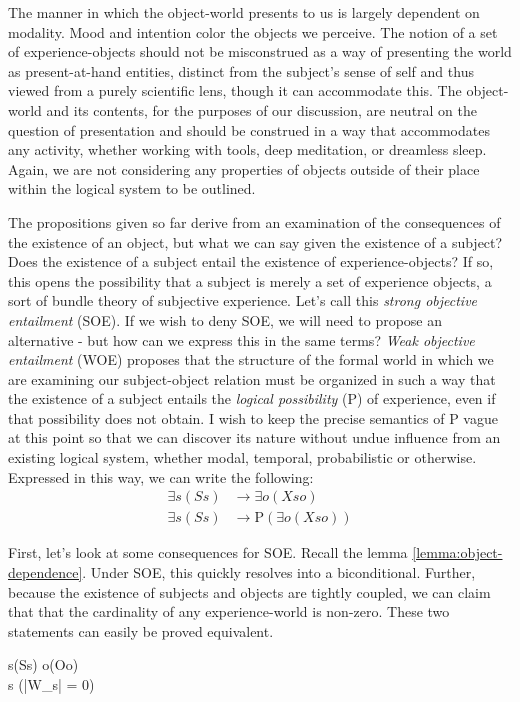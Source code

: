 \documentclass[leqno]{article}
\newcounter{lemma}
\begin{document}
	The manner in which the object-world presents to us is largely dependent on
	modality. Mood and intention color the objects we perceive. The notion of a
	set of experience-objects should not be misconstrued as a way of presenting
	the world as present-at-hand entities, distinct from the subject's sense of self
	and thus viewed from a purely scientific lens, though it can accommodate this.
	The object-world and its contents, for the purposes of our discussion, are neutral
	on the question of presentation and should be construed in a way that accommodates
	any activity, whether working with tools, deep meditation, or dreamless sleep.
	Again, we are not considering any properties of objects outside of their place
	within the logical system to be outlined.

	The propositions given so far derive from an examination of the consequences
	of the existence of an object, but what we can say given the existence of a subject?
	Does the existence of a subject entail the existence of experience-objects? If
	so, this opens the possibility that a subject is merely a set of experience
	objects, a sort of bundle theory of subjective experience. Let's call this
	\emph{strong objective entailment} (SOE). If we wish to deny SOE, we will need
	to propose an alternative - but how can we express this in the same terms?
	\emph{Weak objective entailment} (WOE) proposes that the structure of the formal
	world in which we are examining our subject-object relation must be organized in
	such a way that the existence of a subject entails the \emph{logical
	possibility} ($\mathrm{P}$) of experience, even if that possibility does not obtain.
	I wish to keep the precise semantics of $\mathrm{P}$ vague at this point so
	that we can discover its nature without undue influence from an existing
	logical system, whether modal, temporal, probabilistic or otherwise. Expressed
	in this way, we can write the following:
	\begin{align}
		\label{def:soe}\tag{SOE}\exists s (Ss) & \rightarrow \exists o (Xso)            \\
		\label{def:woe}\tag{WOE}\exists s (Ss) & \rightarrow \mathrm{P}(\exists o(Xso))
	\end{align}

	First, let's look at some consequences for SOE. Recall the lemma \eqref{lemma:object-dependence}.
	Under SOE, this quickly resolves into a biconditional. Further, because the
	existence of subjects and objects are tightly coupled, we can claim that that the
	cardinality of any experience-world is non-zero. These two statements can
	easily be proved equivalent.
	\begin{lemmalist}
		[SOE.][soe] \label{lemma:soe1} \exists s(Ss) \leftrightarrow \exists o(Oo) \\
		\label{lemma:soe2} \forall s (|W_s| \not= 0)
	\end{lemmalist}
\end{document}
